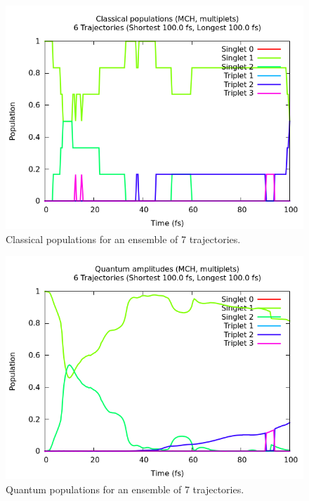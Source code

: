 \documentclass[a4paper,11pt,DIV=15,openany]{scrbook}
\begin{document}
\begin{figure}[ptb]
  \centering
  \includegraphics[width=\textwidth]{figures/pop_class.png}
  \caption{Classical populations for an ensemble of 7 trajectories.}
  \label{fig:pop_class}
\end{figure}
\begin{figure}[ptb]
  \centering
  \includegraphics[width=\textwidth]{figures/pop_quant.png}
  \caption{Quantum populations for an ensemble of 7 trajectories.}
  \label{fig:pop_quant}
\end{figure}
\end{document}
